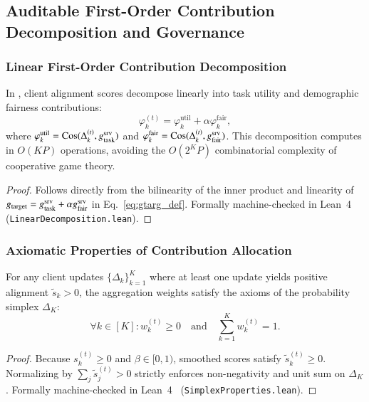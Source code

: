 \subsection{Auditable First-Order Contribution Decomposition and Governance}
\label{subsec:governance}

\subsubsection{Linear First-Order Contribution Decomposition}
\begin{proposition}
\label{prop:linear_shapley}
In \MethodName{}, client alignment scores decompose linearly into task utility and demographic fairness contributions:
\begin{equation}
\label{eq:linear_decomp}
\varphi_k^{(t)} = \varphi_k^{\mathrm{util}} + \alpha \varphi_k^{\mathrm{fair}},
\end{equation}
where $\varphi_k^{\mathrm{util}} = \operatorname{Cos}(\Delta_k^{(t)}, g_{\mathrm{task}}^{\mathrm{srv}})$ and $\varphi_k^{\mathrm{fair}} = \operatorname{Cos}(\Delta_k^{(t)}, g_{\mathrm{fair}}^{\mathrm{srv}})$. This decomposition computes in $O(KP)$ operations, avoiding the $O(2^K P)$ combinatorial complexity of cooperative game theory.
\end{proposition}
\begin{proof}
Follows directly from the bilinearity of the inner product and linearity of $g_{\mathrm{target}} = g_{\mathrm{task}}^{\mathrm{srv}} + \alpha g_{\mathrm{fair}}^{\mathrm{srv}}$ in Eq.~\eqref{eq:gtarg_def}. Formally machine-checked in Lean~4~\citep{demoura2021lean} (\texttt{Linear}\allowbreak\texttt{Decomposition.lean}).
\end{proof}

\subsubsection{Axiomatic Properties of Contribution Allocation}
\begin{proposition}
\label{prop:simplex_validity}
For any client updates $\{\Delta_k\}_{k=1}^K$ where at least one update yields positive alignment $\tilde{s}_k > 0$, the aggregation weights satisfy the axioms of the probability simplex $\Delta_K$:
\begin{equation}
\label{eq:simplex_prop}
\forall k \in [K]: w_k^{(t)} \ge 0 \quad \text{and} \quad \sum_{k=1}^K w_k^{(t)} = 1.
\end{equation}
\end{proposition}
\begin{proof}
Because $s_k^{(t)} \ge 0$ and $\beta \in [0, 1)$, smoothed scores satisfy $\tilde{s}_k^{(t)} \ge 0$. Normalizing by $\sum_j \tilde{s}_j^{(t)} > 0$ strictly enforces non-negativity and unit sum on $\Delta_K$. Formally machine-checked in Lean~4~\citep{demoura2021lean} (\texttt{Simplex}\allowbreak\texttt{Properties.lean}).
\end{proof}

